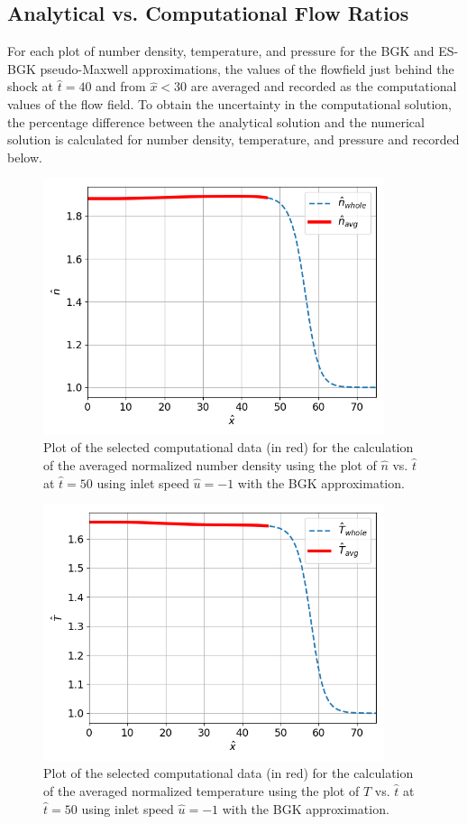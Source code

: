 \documentclass[a4paper]{article}
\begin{document}
\subsection{Analytical vs. Computational Flow Ratios}
For each plot of number density, temperature, and pressure for the BGK and ES-BGK pseudo-Maxwell approximations, the values of the flowfield just behind the shock at $\hat{t} = 40$ and from $\hat{x} < 30$ are averaged and recorded as the computational values of the flow field. To obtain the uncertainty in the computational solution, the percentage difference between the analytical solution and the numerical solution is calculated for number density, temperature, and pressure and recorded below.  
\begin{figure}[hbt!]
    \centering
    \includegraphics[width=10cm]{plots/problem_h_BGK_n.png}
    \caption{\centering Plot of the selected computational data (in red) for the calculation of the averaged normalized number density using the plot of $\hat{n}$ vs. $\hat{t}$ at $\hat{t} = 50$ using inlet speed $\hat{u} = -1$ with the BGK approximation.}
    \label{problem_h_BGK_n}
\end{figure}
\begin{figure}[hbt!]
    \centering
    \includegraphics[width=10cm]{plots/problem_h_BGK_T.png}
    \caption{\centering Plot of the selected computational data (in red) for the calculation of the averaged normalized temperature using the plot of $\hat{T}$ vs. $\hat{t}$ at $\hat{t} = 50$ using inlet speed $\hat{u} = -1$ with the BGK approximation.}
    \label{problem_h_BGK_T}
\end{figure}
\end{document}
